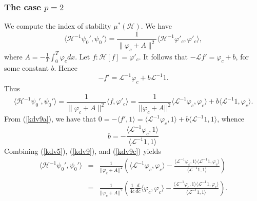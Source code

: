 \documentclass[final,11pt,leqno]{amsart}
\begin{document}
\subsubsection{The case $p=2$}
We compute the index of stability $\mu^*({\mathcal H})$. We have
  \begin{equation}\label{kdv9}
    \langle {\mathcal H}^{-1}\psi_0', \psi_0'\rangle ={\frac{1}{\|\varphi_c+A\|^2}} \langle {\mathcal H}^{-1}\varphi'_c, \varphi'_c\rangle
    ,
    \end{equation}
    where $A=-{\frac{1}{T}}\int_{0}^{T}{\varphi_c}dx.$ Let $f:
    {\mathcal H}[f]=\varphi'_c$. It follows that $-{\mathcal L} f'=\varphi_c+b$, for
    some constant $b$. Hence
      \begin{equation}\label{kdv9a}
        -f'={\mathcal L}^{-1}\varphi_c + b{\mathcal L}^{-1}1.
      \end{equation}
      Thus
      \begin{equation}\label{kdv9b}
        \langle {\mathcal H}^{-1}\psi_0',
        \psi_0'\rangle={\frac{1}{\|\varphi_c+A\|^2}}\langle f,
        \varphi'_c\rangle={\frac{1}{||\varphi_c+A||^2}}\langle {\mathcal L}^{-1}\varphi_c,
        \varphi_c\rangle +b\langle {\mathcal L}^{-1}1, \varphi_c\rangle .
      \end{equation}
   From (\ref{kdv9a}), we have that $0=-{\langle {f'},{1} \rangle}={\langle {{\mathcal L}^{-1}\varphi_c},{1} \rangle}+b{\langle {{\mathcal L}^{-1}1},{1} \rangle}$, whence
     \begin{equation}\label{kdv9c}
       b=-\frac{\langle {\mathcal L}^{-1}\varphi_c, 1\rangle}{\langle
       {\mathcal L}^{-1}1,1\rangle }
     \end{equation}
Combining (\ref{kdv5}), (\ref{kdv9}), and  (\ref{kdv9c}) yields
       \begin{eqnarray*}
        \langle {\mathcal H}^{-1}\psi_0', \psi_0'\rangle
        &= & {\frac{1}{||\varphi_c+A||^2}}\left( \langle {\mathcal L}^{-1}\varphi_c,
        \varphi_c \rangle -{\frac{\langle {\mathcal L}^{-1}\varphi_c, 1 \rangle\langle {\mathcal L}^{-1}1,
        \varphi_c\rangle}{\langle
       {\mathcal L}^{-1}1,1\rangle }}\right) \\
        \\
        &=& {\frac{1}{||\varphi_c+A||^2}}\left( {\frac{1}{4c}}{\frac{d}{dc}}\langle \varphi_c, \varphi_c\rangle-{\frac{\langle {\mathcal L}^{-1}\varphi_c, 1\rangle \langle {\mathcal L}^{-1}1,
        \varphi_c\rangle}{\langle
       {\mathcal L}^{-1}1,1\rangle }}\right).
       \end{eqnarray*}
\end{document}
